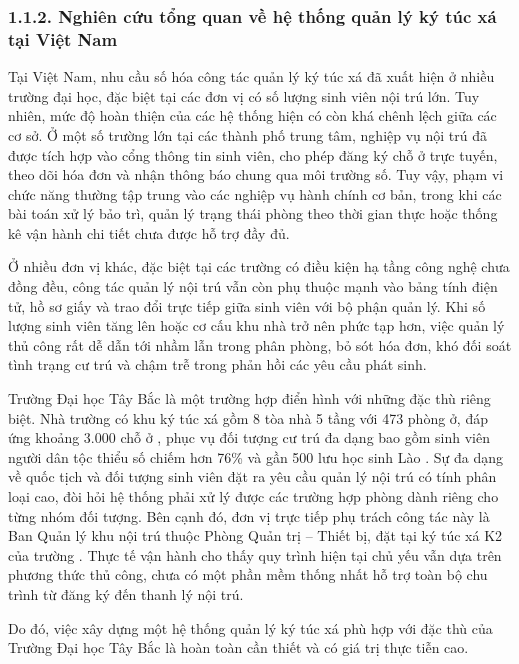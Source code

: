 \documentclass[12pt]{article}
\begin{document}
\subsubsection*{1.1.2. Nghiên cứu tổng quan về hệ thống quản lý ký túc xá tại Việt Nam}

Tại Việt Nam, nhu cầu số hóa công tác quản lý ký túc xá đã xuất hiện ở nhiều trường đại học, đặc biệt tại các đơn vị có số lượng sinh viên nội trú lớn. Tuy nhiên, mức độ hoàn thiện của các hệ thống hiện có còn khá chênh lệch giữa các cơ sở. Ở một số trường lớn tại các thành phố trung tâm, nghiệp vụ nội trú đã được tích hợp vào cổng thông tin sinh viên, cho phép đăng ký chỗ ở trực tuyến, theo dõi hóa đơn và nhận thông báo chung qua môi trường số. Tuy vậy, phạm vi chức năng thường tập trung vào các nghiệp vụ hành chính cơ bản, trong khi các bài toán xử lý bảo trì, quản lý trạng thái phòng theo thời gian thực hoặc thống kê vận hành chi tiết chưa được hỗ trợ đầy đủ.

Ở nhiều đơn vị khác, đặc biệt tại các trường có điều kiện hạ tầng công nghệ chưa đồng đều, công tác quản lý nội trú vẫn còn phụ thuộc mạnh vào bảng tính điện tử, hồ sơ giấy và trao đổi trực tiếp giữa sinh viên với bộ phận quản lý. Khi số lượng sinh viên tăng lên hoặc cơ cấu khu nhà trở nên phức tạp hơn, việc quản lý thủ công rất dễ dẫn tới nhầm lẫn trong phân phòng, bỏ sót hóa đơn, khó đối soát tình trạng cư trú và chậm trễ trong phản hồi các yêu cầu phát sinh.

Trường Đại học Tây Bắc là một trường hợp điển hình với những đặc thù riêng biệt. Nhà trường có khu ký túc xá gồm 8 tòa nhà 5 tầng với 473 phòng ở, đáp ứng khoảng 3.000 chỗ ở \cite{utb_ktx}, phục vụ đối tượng cư trú đa dạng bao gồm sinh viên người dân tộc thiểu số chiếm hơn 76\% và gần 500 lưu học sinh Lào \cite{utb_khaigiang2024}. Sự đa dạng về quốc tịch và đối tượng sinh viên đặt ra yêu cầu quản lý nội trú có tính phân loại cao, đòi hỏi hệ thống phải xử lý được các trường hợp phòng dành riêng cho từng nhóm đối tượng. Bên cạnh đó, đơn vị trực tiếp phụ trách công tác này là Ban Quản lý khu nội trú thuộc Phòng Quản trị -- Thiết bị, đặt tại ký túc xá K2 của trường \cite{utb_phongsban}. Thực tế vận hành cho thấy quy trình hiện tại chủ yếu vẫn dựa trên phương thức thủ công, chưa có một phần mềm thống nhất hỗ trợ toàn bộ chu trình từ đăng ký đến thanh lý nội trú.

Do đó, việc xây dựng một hệ thống quản lý ký túc xá phù hợp với đặc thù của Trường Đại học Tây Bắc là hoàn toàn cần thiết và có giá trị thực tiễn cao.
\end{document}
